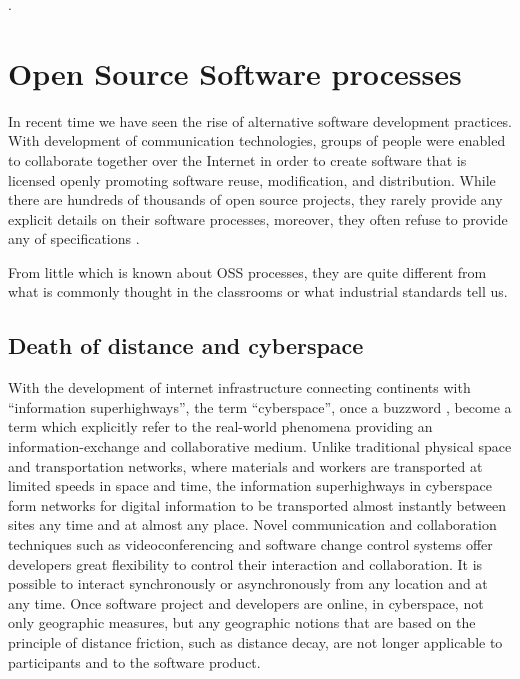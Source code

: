 .

\section{Open Source Software processes}\label{oss.processes}
In recent time we have seen the rise of alternative software development practices. 
With development of communication technologies, groups of people were 
enabled to collaborate together over the Internet in order to create software that is 
licensed openly promoting software reuse, modification, and distribution. While there are 
hundreds of thousands of open source projects, they rarely provide any explicit details on 
their software processes, moreover, they often refuse to provide any of 
specifications \cite{Torvalds:2005}. 

From little which is known about OSS processes, they are quite different from what is 
commonly thought in the classrooms or what industrial standards tell us.

\subsection{Death of distance and cyberspace}
With the development of internet infrastructure connecting continents with ``information
superhighways'', the term ``cyberspace'', once a buzzword \cite{citeulike:11095763}, become 
a term which explicitly refer to the real-world phenomena providing an information-exchange
and collaborative medium. Unlike traditional physical space and transportation networks, where 
materials and workers are transported at limited speeds in space and time, the information 
superhighways in cyberspace form networks for digital information to be transported almost instantly 
between sites any time and at almost any place. 
Novel communication and collaboration techniques such as videoconferencing and software change 
control systems offer developers great flexibility to control their interaction and collaboration. 
It is possible to interact synchronously or asynchronously from any location and at any time. 
Once software project and developers are online, in cyberspace, not only geographic measures, but 
any geographic notions that are based on the principle of distance friction, such as distance decay,
are not longer applicable to participants and to the software product.

